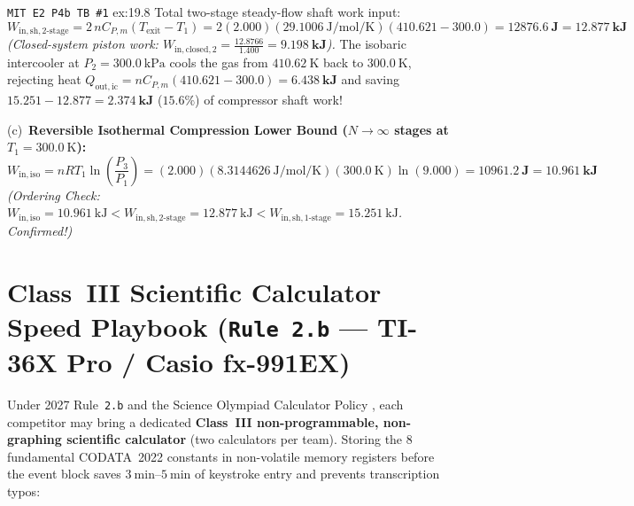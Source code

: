 \begin{workedexample}{\texttt{MIT E2 P4b TB \#1} }{ex:19.8}
Total two-stage steady-flow shaft work input:
$$W_{\mathrm{in,sh,2\text{-}stage}} = 2\,n C_{P,m}(T_{\mathrm{exit}} - T_1) = 2(2.000)(\SI{29.1006}{\joule\per\mole\per\kelvin})(410.621 - 300.0) = \mathbf{\SI{12876.6}{\joule}} = \mathbf{\SI{12.877}{\kilo\joule}}$$
\emph{(Closed-system piston work: $W_{\mathrm{in,closed,2}} = \frac{12.8766}{1.400} = \mathbf{\SI{9.198}{\kilo\joule}}$).} The isobaric intercooler at $P_2 = \SI{300.0}{\kilo\pascal}$ cools the gas from $\SI{410.62}{\kelvin}$ back to $\SI{300.0}{\kelvin}$, rejecting heat $Q_{\mathrm{out,ic}} = n C_{P,m}(410.621 - 300.0) = \mathbf{\SI{6.438}{\kilo\joule}}$ and saving $15.251 - 12.877 = \mathbf{\SI{2.374}{\kilo\joule}}$ ($\mathbf{15.6\%}$) of compressor shaft work!
\par\smallskip\noindent
(c)~\textbf{Reversible Isothermal Compression Lower Bound ($N \to \infty$ stages at $T_1 = \SI{300.0}{\kelvin}$):}
$$W_{\mathrm{in,iso}} = n R T_1 \ln\!\left(\frac{P_3}{P_1}\right) = (2.000)(\SI{8.3144626}{\joule\per\mole\per\kelvin})(\SI{300.0}{\kelvin})\ln(9.000) = \mathbf{\SI{10961.2}{\joule}} = \mathbf{\SI{10.961}{\kilo\joule}}$$
\emph{(Ordering Check: $W_{\mathrm{in,iso}} = \SI{10.961}{\kilo\joule} < W_{\mathrm{in,sh,2\text{-}stage}} = \SI{12.877}{\kilo\joule} < W_{\mathrm{in,sh,1\text{-}stage}} = \SI{15.251}{\kilo\joule}$. Confirmed!)}
\end{workedexample}

\section{Class~III Scientific Calculator Speed Playbook (\texttt{Rule 2.b} --- TI-36X Pro / Casio fx-991EX)}\label{sec:19.4}

Under 2027 Rule~\texttt{2.b} and the Science Olympiad Calculator Policy , each competitor may bring a dedicated \textbf{Class~III non-programmable, non-graphing scientific calculator} (two calculators per team). Storing the 8 fundamental CODATA~2022 constants  in non-volatile memory registers before the event block saves $\SIrange{3}{5}{\minute}$ of keystroke entry and prevents transcription typos:

